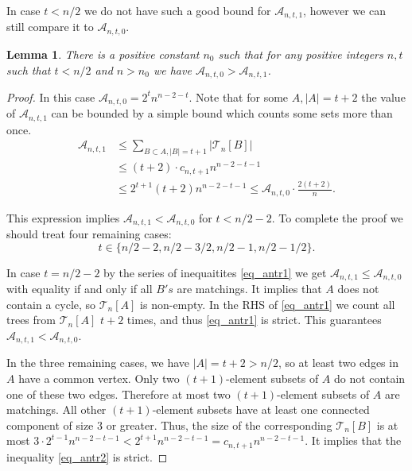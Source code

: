 \documentclass[11pt,letterpaper]{amsart}
\renewcommand{\le}{\leqslant}
\newcommand{\aaa}{\mathcal{A}}
\newcommand{\m}{\mathcal }
\newcommand{\T}{\mathcal{T}}
\newtheorem{lemma}[theorem]{Lemma}
\begin{document}
In case $t < n/2$ we do not have such a good bound for $\aaa_{n, t, 1}$, however we can still compare it to $\aaa_{n, t, 0}$.

\begin{lemma}\label{ant1}
    There is a positive constant $n_0$ such that for any positive integers $n,t$ such that $t<n/2$ and $n > n_0$ we have $\aaa_{n, t, 0} > \aaa_{n, t,1}$.
\end{lemma}

\begin{proof}
    In this case $\aaa_{n, t, 0} = 2^tn^{n-2-t}$. Note that for some $A, |A| = t+2$ the value of $\aaa_{n, t, 1}$ can be bounded by a simple bound which counts some sets more than once.
    \begin{align}
    \label{eq_antr1}\aaa_{n, t, 1} &\leqslant\sum_{B \subset A, |B| = t+1}|\T_n[B]| \\
     \label{eq_antr2}&\le  (t+2)\cdot c_{n, t+1} n^{n-2-t-1} \\
     \label{eq_antr3}&\le 2^{t+1}(t+2)n^{n-2-t-1} \leqslant \aaa_{n, t, 0} \cdot \frac {2(t+2)}{n}.
    \end{align}

    This expression implies $\aaa_{n, t, 1} < \aaa_{n, t, 0}$ for $t < n/2 - 2$. To complete the proof we should treat four remaining cases: $$t \in \{n/2 - 2, n/2 - 3/2, n/2 - 1, n/2 - 1/2\}.$$
    
    In case $t = n/2 - 2$ by the series of inequaitites \eqref{eq_antr1} we get $\aaa_{n, t, 1} \le \aaa_{n, t, 0}$ with equality if and only if all $B's$ are matchings. It implies that $A$ does not contain a cycle, so $\T_n[A]$ is non-empty. In  the RHS of \eqref{eq_antr1} we count all trees from $\T_n[A]$ $t+2$ times, and thus \eqref{eq_antr1} is strict. This guarantees $\aaa_{n, t, 1} < \aaa_{n, t, 0}$.
    
    In the three remaining cases, we have $|A| = t+2 > n/2$, so at least two edges in $A$ have a common vertex. Only two $(t+1)$-element subsets of $A$ do not contain one of these two edges. Therefore at most two $(t+1)$-element subsets of $A$ are matchings. All other $(t+1)$-element subsets have at least one connected component of size $3$ or greater. Thus, the size of the corresponding $\m T_n[B]$ is at most  $3\cdot 2^{t-1}n^{n-2-t-1}<2^{t+1}n^{n-2-t-1}=c_{n,t+1}n^{n-2-t-1}$.  It implies that the inequality \eqref{eq_antr2} is strict. 
\end{proof}
\end{document}
